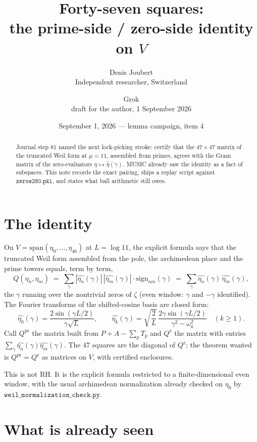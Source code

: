 \documentclass[10pt]{article}
\title{\bfseries Forty-seven squares:\\
the prime-side / zero-side identity on $V$}
\author{Denis Joubert\\ \small Independent researcher, Switzerland
\and Grok\\ \small draft for the author, 1 September 2026}
\date{September 1, 2026 --- lemma campaign, item 4}
\begin{document}
\maketitle
\begin{abstract}
\noindent
Journal step 81 named the next lock-picking stroke: certify that the
$47\times47$ matrix of the truncated Weil form at $\mu=11$, assembled
from primes, agrees with the Gram matrix of the zero-evaluators
$\eta\mapsto\hat\eta(\gamma)$. MUSIC already saw the identity as a
fact of subspaces. This note records the exact pairing, ships a
replay script against $\mathtt{zeros280.pkl}$, and states what ball
arithmetic still owes.
\end{abstract}

\section{The identity}

On $V=\mathrm{span}(\eta_0,\dots,\eta_{46})$ at $L=\log11$, the
explicit formula says that the truncated Weil form assembled from the
pole, the archimedean place and the prime towers equals, term by term,
\[
Q(\eta_n,\eta_m)
\;=\;
\sum_{\gamma}| \widehat{\eta_n}(\gamma)|\,|\widehat{\eta_m}(\gamma)|
\cdot\mathrm{sign}_{nm}(\gamma)
\;=\;
\sum_{\gamma}\widehat{\eta_n}(\gamma)\,\widehat{\eta_m}(\gamma),
\]
the $\gamma$ running over the nontrivial zeros of $\zeta$ (even
window: $\gamma$ and $-\gamma$ identified). The Fourier transforms of
the shifted-cosine basis are closed form:
\[
\widehat{\eta_0}(\gamma)
=\frac{2\sin(\gamma L/2)}{\gamma\sqrt L},\qquad
\widehat{\eta_k}(\gamma)
=\sqrt{\frac2L}\,\frac{2\gamma\sin(\gamma L/2)}{\gamma^2-\omega_k^2}
\quad(k\ge1).
\]
Call $Q^{\mathrm{pr}}$ the matrix built from $P+A-\sum_p T_p$ and
$Q^{\mathrm{z}}$ the matrix with entries
$\sum_{\gamma}\widehat{\eta_n}(\gamma)\widehat{\eta_m}(\gamma)$.
The $47$ squares are the diagonal of $Q^{\mathrm{z}}$; the theorem
wanted is $Q^{\mathrm{pr}}=Q^{\mathrm{z}}$ as matrices on $V$, with
certified enclosures.

This is not RH. It is the explicit formula restricted to a
finite-dimensional even window, with the usual archimedean
normalization already checked on $\eta_0$ by
$\mathtt{weil\_normalization\_check.py}$.

\section{What is already seen}
\end{document}
